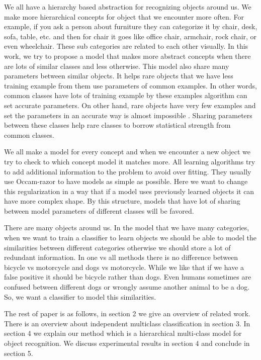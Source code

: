 \documentclass[10pt,twocolumn,letterpaper]{article}
\begin{document}
We all have a hierarchy based abstraction for recognizing objects around
us. We make more hierarchical concepts for object that we encounter more often.
For example, if you ask a person about furniture they can categorize it by
chair, desk, sofa, table, etc. and then for chair it goes like office chair,
armchair, rock chair, or even wheelchair. These sub categories are related
to each other visually. In this work, we try to propose a model that makes
more abstract concepts when there are lots of similar classes and less
otherwise. This model also share many parameters between similar objects.
It helps rare objects that we have less training example from them use
parameters of common examples. In other words, common classes have lots of
training example by these examples algorithm can set accurate parameters.
On other hand, rare objects have very few examples and set the parameters
in an accurate way is almost impossible . Sharing parameters between these
classes help rare classes to borrow statistical strength from common
classes. 

We all make a model for every concept and when we encounter a new object we try to
check to which concept model it matches more. All learning algorithms try to add
additional information to the problem to avoid over fitting. They usually use
Occam-razor to have models as simple as possible. Here we want to
change this regularization in a way that if a model uses previously learned
objects it can have more complex shape. By this structure, models that have lot
of sharing between model parameters of different classes will be favored.

There are many objects around us. In the model that we have many categories,
when we want to train a classifier to learn objects we should be able to
model the similarities between different categories otherwise we should
store a lot of redundant information. In one vs all methods there is no
difference between bicycle vs motorcycle and dogs vs motorcycle. While we
like that if we have a false positive it should be bicycle rather than dogs. 
Even humans sometimes are confused between different dogs or wrongly
assume another animal to be a dog. So, we want a classifier to model this
similarities.  

The rest of paper is as follows, in section 2 we give an overview of related work.
There is an overview about independent multiclass classification in section 3. In
section 4 we explain our method which is a hierarchical multi-class model for
object recognition. We discuss experimental results in section 4 and conclude 
in section 5.
\end{document}
